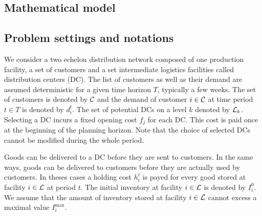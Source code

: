 \documentclass[a4paper,10pt]{article}
\begin{document}
\begin{linenumbers}
\newpage

\section{Mathematical model}

\label{sec:model}

\subsection{Problem settings and notations}
%		



We consider a two echelon distribution network composed of one production facility, a set of customers and a set intermediate logistics facilities called distribution centers (DC). 
The list of customers as well as their demand are assumed deterministic for a given time horizon $T$, typically a few weeks. 
The set of customers is denoted by $\mathcal{C}$ and the demand of customer $i \in \mathcal{C}$ at time period $t\in T$ is denoted by $d^t_i$.
The set of potential DCs on a level $k$ denoted by $\mathcal{L}_k$.
Selecting a DC incurs a fixed opening cost $f_j$ for each DC. This cost is paid once at the beginning of the planning horizon. 
Note that the choice of selected DCs cannot be modified during the whole period. 

Goods can be delivered to a DC before they are sent to customers. In the same ways, goods can be delivered to customers before they are actually used by customers. In theses cases a holding cost $h^t_i$ is payed for every good stored at facility $i \in \mathcal{L}$ at period $t$.
The initial inventory at facility $i \in \mathcal{L}$ is denoted by $I_i^0$. 
We assume that the amount of inventory stored at facility $i \in \mathcal{L}$ cannot excess a maximal value $I_i^{\max}$. 


\end{linenumbers}
\end{document}
